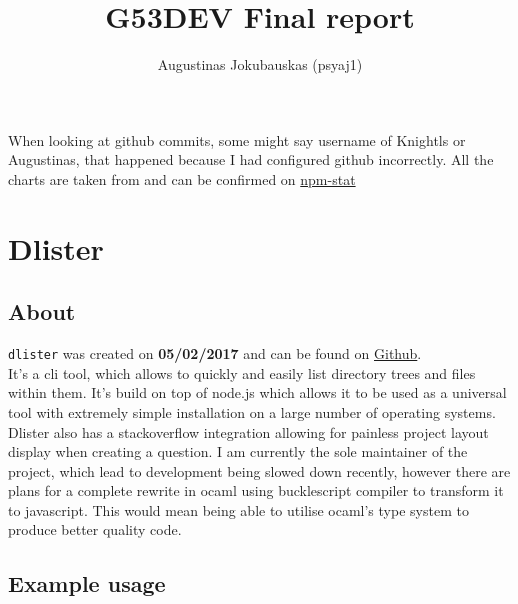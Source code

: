 \documentclass{article}
\title{G53DEV Final report}
\author{Augustinas Jokubauskas (psyaj1)}
\begin{document}
\maketitle

\begin{flushleft}
When looking at github commits, some might say username of Knightls or Augustinas, that happened because I had configured github incorrectly. All the charts are taken from and can be confirmed on \href{https://npm-stat.com}{npm-stat}
\end{flushleft}

\pagebreak

\tableofcontents

\newpage

\section{Dlister}

\subsection{About}

\begin{flushleft}
\texttt{dlister} was created on \textbf{05/02/2017} and can be found on \href{https://github.com/WhoAteDaCake/dlister}{Github}. \\
It's a cli tool, which allows to quickly and easily list directory trees and files within them. It's build on top of node.js which allows it to be used as a universal tool with extremely simple installation on a large number of operating systems. Dlister also has a stackoverflow integration allowing for painless project layout display when creating a question. I am currently the sole maintainer of the project, which lead to development being slowed down recently, however there are plans for a complete rewrite in ocaml using bucklescript compiler to transform it to javascript. This would mean being able to utilise ocaml's type system to produce better quality code.
\end{flushleft}

\subsection{Example usage}
\end{document}
